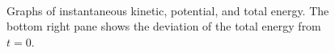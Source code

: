 \documentclass[singlepage,notitlepage,nofootinbib,11pt]{revtex4-1}
\begin{document}
\begin{figure}[]
  \captionsetup[subfigure]{labelformat=empty}
  \centering
  \\
  \hfill
  \caption{\label{fig10} Graphs of instantaneous kinetic, potential, and total energy. The bottom right pane shows the deviation of the total energy from $t=0$.}
\end{figure}
\end{document}
